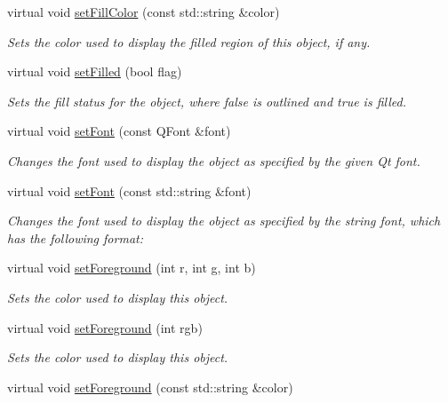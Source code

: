 \begin{DoxyCompactItemize}
virtual void \mbox{\hyperlink{classGObject_adbc18b1a930aadd97d7437f9f7265b96}{set\+Fill\+Color}} (const std\+::string \&color)
\begin{DoxyCompactList}\small\item\em Sets the color used to display the filled region of this object, if any. \end{DoxyCompactList}\item 
virtual void \mbox{\hyperlink{classGObject_a9b82b53362282c6bb7d6947068d2e55b}{set\+Filled}} (bool flag)
\begin{DoxyCompactList}\small\item\em Sets the fill status for the object, where {\ttfamily false} is outlined and {\ttfamily true} is filled. \end{DoxyCompactList}\item 
virtual void \mbox{\hyperlink{classGObject_a2592348886ffea646c6534bf88f7c49d}{set\+Font}} (const Q\+Font \&font)
\begin{DoxyCompactList}\small\item\em Changes the font used to display the object as specified by the given Qt font. \end{DoxyCompactList}\item 
virtual void \mbox{\hyperlink{classGObject_a8e096e8818d838aceae1d46d58fb3a7b}{set\+Font}} (const std\+::string \&font)
\begin{DoxyCompactList}\small\item\em Changes the font used to display the object as specified by the string {\ttfamily font}, which has the following format\+: \end{DoxyCompactList}\item 
virtual void \mbox{\hyperlink{classGObject_ad18e8fab1e02a4e9b75c6730212558eb}{set\+Foreground}} (int r, int g, int b)
\begin{DoxyCompactList}\small\item\em Sets the color used to display this object. \end{DoxyCompactList}\item 
virtual void \mbox{\hyperlink{classGObject_a9eb856b5ff83a19df3831a31f15f4563}{set\+Foreground}} (int rgb)
\begin{DoxyCompactList}\small\item\em Sets the color used to display this object. \end{DoxyCompactList}\item 
virtual void \mbox{\hyperlink{classGObject_af59209aeadea6dfc6d97a2d8531f50e1}{set\+Foreground}} (const std\+::string \&color)

\end{DoxyCompactItemize}
